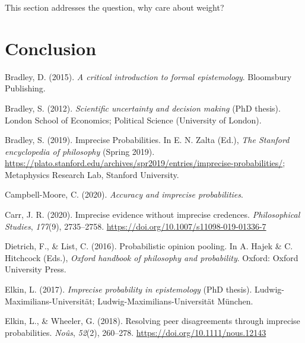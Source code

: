 \documentclass[
  10pt,
  dvipsnames,enabledeprecatedfontcommands]{scrartcl}
\newlength{\cslhangindent}
\newlength{\cslentryspacingunit} %
\newenvironment{CSLReferences}[2] %
 {%
  \setlength{\parindent}{0pt}
  \ifodd #1
  \let\oldpar\par
  \def\par{\hangindent=\cslhangindent\oldpar}
  \fi
  \setlength{\parskip}{#2\cslentryspacingunit}
 }%
 {}
\begin{document}
This section addresses the question, why care about weight?

\hypertarget{conclusion}{%
\section*{Conclusion}\label{conclusion}}

\hypertarget{refs}{}
\begin{CSLReferences}{1}{0}
\leavevmode{}%
Bradley, D. (2015). \emph{A critical introduction to formal
epistemology}. Bloomsbury Publishing.

\leavevmode{}%
Bradley, S. (2012). \emph{Scientific uncertainty and decision making}
(PhD thesis). London School of Economics; Political Science (University
of London).

\leavevmode{}%
Bradley, S. (2019). {Imprecise Probabilities}. In E. N. Zalta (Ed.),
\emph{The {Stanford} encyclopedia of philosophy} ({S}pring 2019).
\url{https://plato.stanford.edu/archives/spr2019/entries/imprecise-probabilities/};
Metaphysics Research Lab, Stanford University.

\leavevmode{}%
Campbell-Moore, C. (2020). \emph{Accuracy and imprecise probabilities}.

\leavevmode{}%
Carr, J. R. (2020). Imprecise evidence without imprecise credences.
\emph{Philosophical Studies}, \emph{177}(9), 2735--2758.
\url{https://doi.org/10.1007/s11098-019-01336-7}

\leavevmode{}%
Dietrich, F., \& List, C. (2016). Probabilistic opinion pooling. In A.
Hajek \& C. Hitchcock (Eds.), \emph{Oxford handbook of philosophy and
probability}. Oxford: Oxford University Press.

\leavevmode{}%
Elkin, L. (2017). \emph{Imprecise probability in epistemology} (PhD
thesis). Ludwig-Maximilians-Universit{ä}t;
Ludwig-Maximilians-Universität München.

\leavevmode{}%
Elkin, L., \& Wheeler, G. (2018). Resolving peer disagreements through
imprecise probabilities. \emph{Noûs}, \emph{52}(2), 260--278.
\url{https://doi.org/10.1111/nous.12143}


\end{CSLReferences}
\end{document}
